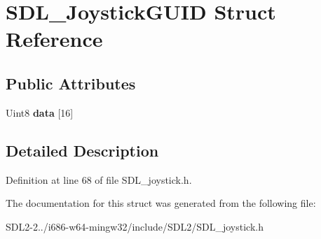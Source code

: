 \hypertarget{structSDL__JoystickGUID}{\section{S\+D\+L\+\_\+\+Joystick\+G\+U\+I\+D Struct Reference}
\label{structSDL__JoystickGUID}
}
\subsection*{Public Attributes}
\begin{DoxyCompactItemize}
\item 
\hypertarget{structSDL__JoystickGUID_a1fe3143c7d0391a9d119a3e555d5c9b0}{Uint8 {\bfseries data} \mbox{[}16\mbox{]}}\label{structSDL__JoystickGUID_a1fe3143c7d0391a9d119a3e555d5c9b0}

\end{DoxyCompactItemize}


\subsection{Detailed Description}


Definition at line 68 of file S\+D\+L\+\_\+joystick.\+h.



The documentation for this struct was generated from the following file\+:\begin{DoxyCompactItemize}
\item 
S\+D\+L2-\/2../i686-\/w64-\/mingw32/include/\+S\+D\+L2/S\+D\+L\+\_\+joystick.\+h\end{DoxyCompactItemize}
